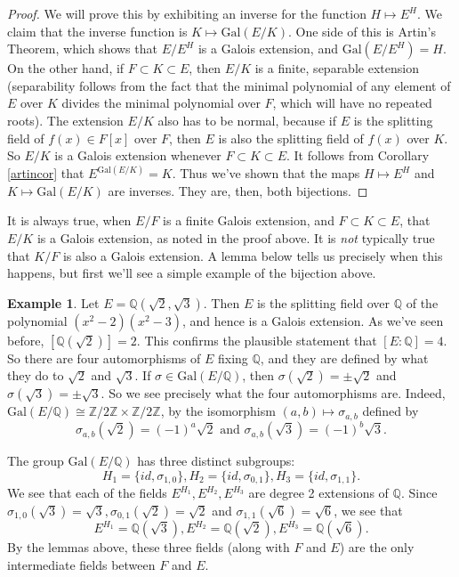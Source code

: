 \documentclass[12pt]{report}
\theoremstyle{definition}
\newtheorem{example}[thm]{Example}
\def\ZZ{\mathbb{Z}}
\def\QQ{\mathbb{Q}}
\def\Gal{\text{Gal}}
\begin{document}
\begin{proof}
    We will prove this by exhibiting an inverse for the function $H \mapsto E^H$. We claim that the inverse function is $K \mapsto \Gal(E/K)$. One side of this is Artin's Theorem, which shows that $E/E^H$ is a Galois extension, and $\Gal(E/E^H) = H$. On the other hand, if $F \subset  K \subset  E$, then $E/K$ is a finite, separable extension (separability follows from the fact that the minimal polynomial of any element of $E$ over $K$ divides the minimal polynomial over $F$, which will have no repeated roots). The extension $E/K$ also has to be normal, because if $E$ is the splitting field of $f(x)\in F[x]$ over $F$, then $E$ is also the splitting field of $f(x)$ over $K$. So $E/K$ is a Galois extension whenever $F \subset  K \subset  E$. It follows from Corollary \ref{artincor} that $E^{\Gal(E/K)} = K$. Thus we've shown that the maps $H \mapsto E^H$ and $K \mapsto \Gal(E/K)$ are inverses. They are, then, both bijections.
\end{proof}


It is always true, when $E/F$ is a finite Galois extension, and $F \subset  K \subset  E$, that $E/K$ is a Galois extension, as noted in the proof above. It is \emph{not} typically true that $K/F$ is also a Galois extension. A lemma below tells us precisely when this happens, but first we'll see a simple example of the bijection above.

\begin{example}
    Let $E = \QQ(\sqrt{2},\sqrt{3})$. Then $E$ is the splitting field over $\QQ$ of the polynomial $(x^2- 2)(x^2 - 3)$, and hence is a Galois extension. As we've seen before, $[\QQ(\sqrt{2})] = 2$. This confirms the plausible statement that $[E : \QQ] = 4$. So there are four automorphisms of $E$ fixing $\QQ$, and they are defined by what they do to $\sqrt{2}$ and $\sqrt{3}$. If $\sigma\in \Gal(E/\QQ)$, then $\sigma(\sqrt{2})=\pm \sqrt{2}$ and $\sigma(\sqrt{3})=\pm \sqrt{3}$. So we see precisely what the four automorphisms are. Indeed, $\Gal(E/\QQ) \cong \ZZ/2\ZZ \times \ZZ/2\ZZ$, by the isomorphism $(a, b) \mapsto \sigma_{a,b}$ defined by $$\sigma_{a,b}(\sqrt{2})=(-1)^a \sqrt{2}\mbox{ and }\sigma_{a,b}(\sqrt{3})=(-1)^b \sqrt{3}.$$

    The group $\Gal(E/\QQ)$ has three distinct subgroups:
    $$H_1=\{id, \sigma_{1,0}\}, H_2=\{id,\sigma_{0,1}\}, H_3=\{id, \sigma_{1,1}\}.$$ 
    We see that each of the fields $E^{H_1}, E^{H_2}, E^{H_3}$ are degree 2 extensions of $\QQ$. Since $\sigma_{1,0}(\sqrt{3})=\sqrt{3}, \sigma_{0,1}(\sqrt{2})=\sqrt{2}$ and $\sigma_{1,1}(\sqrt{6})=\sqrt{6}$, we see that $$E^{H_1} = \QQ(\sqrt{3}), E^{H_2}=\QQ(\sqrt{2}), E^{H_3}=\QQ(\sqrt{6}).$$
    By the lemmas above, these three fields (along with $F$ and $E$) are the only intermediate fields between $F$ and $E$.
\end{example}
\end{document}
